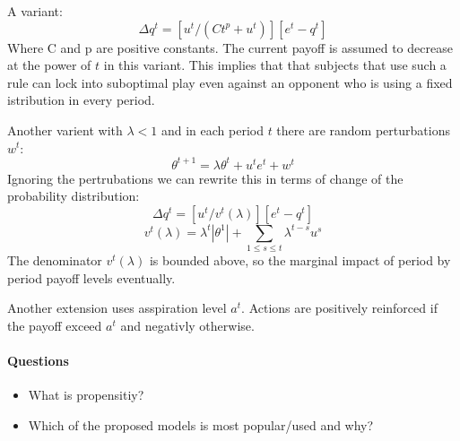 \documentclass{article}
\begin{document}
A variant:
\[\Delta q^t = [u^t/(Ct^p+u^t)][e^t-q^t]\]
Where C and p are positive constants. The current payoff is assumed to decrease
at the power of $t$ in this variant. This implies that that subjects that
use such a rule can lock into suboptimal play even against an opponent
who is using a fixed istribution in every period.

Another varient with $\lambda < 1$ and in each period $t$ there are random
perturbations $w^t$:
\[\theta^{t+1}=\lambda\theta^t+u^te^t+w^t\]
Ignoring the pertrubations we can rewrite this in terms of change of the probability
distribution:
\[\Delta q^t=[u^t/v^t(\lambda)][e^t-q^t]\]
\[v^t(\lambda)=\lambda^t|\theta^1|+\sum_{1\leq s \leq t}\lambda^{t-s}u^s\]
The denominator $v^t(\lambda)$ is bounded above, so the marginal impact
of period by period payoff levels eventually.

Another extension uses asspiration level $a^t$. Actions are positively
reinforced if the payoff exceed $a^t$ and negativly otherwise.
\paragraph{Questions}
\begin{itemize}
	\item What is propensitiy?
	\item Which of the proposed models is most popular/used and why?
\end{itemize}
\end{document}
